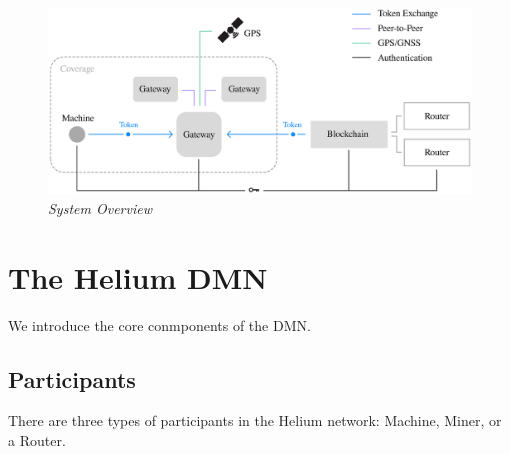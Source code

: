 \documentclass[10pt, nonatbib, nocopyrightspace, reprint]{sigplanconf}
\begin{document}
\begin{figure}[ht]
    \begin{center}
          \includegraphics[width=\textwidth]{schematic.eps}
          \caption{\emph{System Overview}}\label{fig:system}
     \end{center}
\end{figure}


\section{The Helium DMN}

We introduce the core conmponents of the DMN.

\subsection{Participants}

There are three types of participants in the Helium network: Machine, Miner, or a Router.
\end{document}
